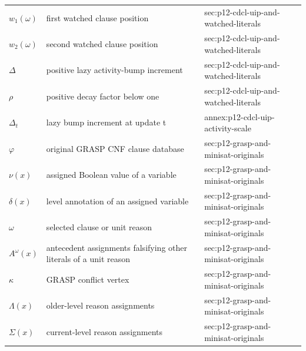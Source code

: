 \begin{longtable}{@{}p{}p{}p{}@{}}
\(w_1(\omega)\) & first watched clause position & sec:\allowbreak{}p12-\allowbreak{}cdcl-\allowbreak{}uip-\allowbreak{}and-\allowbreak{}watched-\allowbreak{}literals \\
\(w_2(\omega)\) & second watched clause position & sec:\allowbreak{}p12-\allowbreak{}cdcl-\allowbreak{}uip-\allowbreak{}and-\allowbreak{}watched-\allowbreak{}literals \\
\(\Delta\) & positive lazy activity-bump increment & sec:\allowbreak{}p12-\allowbreak{}cdcl-\allowbreak{}uip-\allowbreak{}and-\allowbreak{}watched-\allowbreak{}literals \\
\(\rho\) & positive decay factor below one & sec:\allowbreak{}p12-\allowbreak{}cdcl-\allowbreak{}uip-\allowbreak{}and-\allowbreak{}watched-\allowbreak{}literals \\
\(\Delta_t\) & lazy bump increment at update t & annex:\allowbreak{}p12-\allowbreak{}cdcl-\allowbreak{}uip-\allowbreak{}activity-\allowbreak{}scale \\
\(\varphi\) & original GRASP CNF clause database & sec:\allowbreak{}p12-\allowbreak{}grasp-\allowbreak{}and-\allowbreak{}minisat-\allowbreak{}originals \\
\(\nu(x)\) & assigned Boolean value of a variable & sec:\allowbreak{}p12-\allowbreak{}grasp-\allowbreak{}and-\allowbreak{}minisat-\allowbreak{}originals \\
\(\delta(x)\) & level annotation of an assigned variable & sec:\allowbreak{}p12-\allowbreak{}grasp-\allowbreak{}and-\allowbreak{}minisat-\allowbreak{}originals \\
\(\omega\) & selected clause or unit reason & sec:\allowbreak{}p12-\allowbreak{}grasp-\allowbreak{}and-\allowbreak{}minisat-\allowbreak{}originals \\
\(A^\omega(x)\) & antecedent assignments falsifying other literals of a unit reason & sec:\allowbreak{}p12-\allowbreak{}grasp-\allowbreak{}and-\allowbreak{}minisat-\allowbreak{}originals \\
\(\kappa\) & GRASP conflict vertex & sec:\allowbreak{}p12-\allowbreak{}grasp-\allowbreak{}and-\allowbreak{}minisat-\allowbreak{}originals \\
\(\Lambda(x)\) & older-level reason assignments & sec:\allowbreak{}p12-\allowbreak{}grasp-\allowbreak{}and-\allowbreak{}minisat-\allowbreak{}originals \\
\(\Sigma(x)\) & current-level reason assignments & sec:\allowbreak{}p12-\allowbreak{}grasp-\allowbreak{}and-\allowbreak{}minisat-\allowbreak{}originals \\

\end{longtable}
